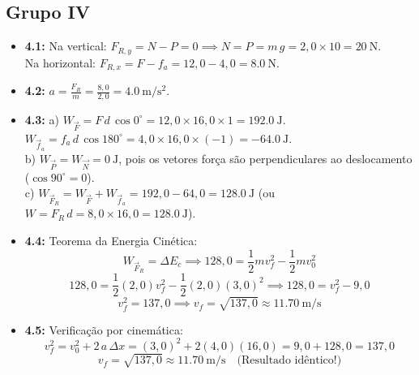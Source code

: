 \documentclass[11pt, a4paper]{article}
\begin{document}
\subsection*{Grupo IV}
\begin{itemize}[leftmargin=1.5em]
  \item \textbf{4.1:} Na vertical: $F_{R, y} = N - P = 0 \implies N = P = m\,g = 2,0 \times 10 = \SI{20}{\newton}$. \\
    Na horizontal: $F_{R, x} = F - f_a = 12,0 - 4,0 = \SI{8,0}{\newton}$.
  \item \textbf{4.2:} $a = \frac{F_R}{m} = \frac{8,0}{2,0} = \SI{4,0}{\meter\per\second\squared}$.
  \item \textbf{4.3:} 
    a) $W_{\vec{F}} = F \, d \, \cos 0^\circ = 12,0 \times 16,0 \times 1 = \SI{192,0}{\joule}$. \\
    $W_{\vec{f}_a} = f_a \, d \, \cos 180^\circ = 4,0 \times 16,0 \times (-1) = \SI{-64,0}{\joule}$. \\
    b) $W_{\vec{P}} = W_{\vec{N}} = \SI{0}{\joule}$, pois os vetores força são perpendiculares ao deslocamento ($\cos 90^\circ = 0$). \\
    c) $W_{\vec{F}_R} = W_{\vec{F}} + W_{\vec{f}_a} = 192,0 - 64,0 = \SI{128,0}{\joule}$ (ou $W = F_R \, d = 8,0 \times 16,0 = \SI{128,0}{\joule}$).
  \item \textbf{4.4:} Teorema da Energia Cinética:
    \[ W_{\vec{F}_R} = \Delta E_c \implies 128,0 = \frac{1}{2} m v_f^2 - \frac{1}{2} m v_0^2 \]
    \[ 128,0 = \frac{1}{2}(2,0) v_f^2 - \frac{1}{2}(2,0)(3,0)^2 \implies 128,0 = v_f^2 - 9,0 \]
    \[ v_f^2 = 137,0 \implies v_f = \sqrt{137,0} \approx \SI{11,70}{\meter\per\second} \]
  \item \textbf{4.5:} Verificação por cinemática:
    \[ v_f^2 = v_0^2 + 2\,a\,\Delta x = (3,0)^2 + 2(4,0)(16,0) = 9,0 + 128,0 = 137,0 \]
    \[ v_f = \sqrt{137,0} \approx \SI{11,70}{\meter\per\second} \quad \text{(Resultado idêntico!)} \]
\end{itemize}
\end{document}
